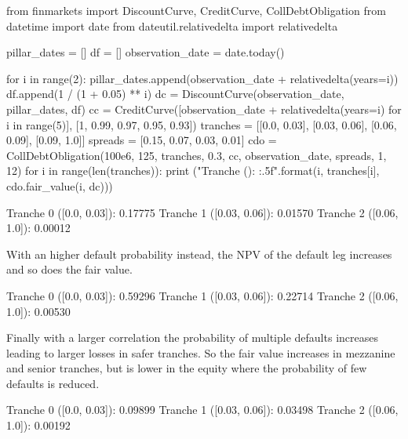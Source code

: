 \begin{solution}
\end{solution}

\begin{ipython}
from finmarkets import DiscountCurve, CreditCurve, CollDebtObligation
from datetime import date
from dateutil.relativedelta import relativedelta

pillar_dates = []
df = []
observation_date = date.today()

for i in range(2):
    pillar_dates.append(observation_date + relativedelta(years=i))
    df.append(1 / (1 + 0.05) ** i)
    dc = DiscountCurve(observation_date, pillar_dates, df)
cc = CreditCurve([observation_date + relativedelta(years=i) for i in range(5)],
    [1, 0.99, 0.97, 0.95, 0.93])
tranches = [[0.0, 0.03], [0.03, 0.06], [0.06, 0.09], [0.09, 1.0]]
spreads = [0.15, 0.07, 0.03, 0.01]
cdo = CollDebtObligation(100e6, 125, tranches, 0.3, cc,
    observation_date, spreads, 1, 12)
for i in range(len(tranches)):
    print ("Tranche {} ({}): {:.5f}".format(i, tranches[i], cdo.fair_value(i, dc)))

Tranche 0 ([0.0, 0.03]): 0.17775
Tranche 1 ([0.03, 0.06]): 0.01570
Tranche 2 ([0.06, 1.0]): 0.00012
\end{ipython}
With an higher default probability instead, the NPV of the default leg increases and so does the fair value.

\begin{ipython}
Tranche 0 ([0.0, 0.03]): 0.59296
Tranche 1 ([0.03, 0.06]): 0.22714
Tranche 2 ([0.06, 1.0]): 0.00530
\end{ipython}
Finally with a larger correlation the probability of multiple defaults increases leading to larger losses in safer tranches. So the fair value increases in mezzanine and senior tranches, but is lower in the equity where the probability of few defaults is reduced.

\begin{ipython}
Tranche 0 ([0.0, 0.03]): 0.09899
Tranche 1 ([0.03, 0.06]): 0.03498
Tranche 2 ([0.06, 1.0]): 0.00192
\end{ipython}
